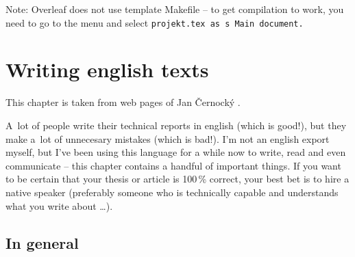 Note: Overleaf does not use template Makefile -- to get compilation to work, you need to go to the menu and select \tt projekt.tex \rm as s~Main document.

\chapter{Writing english texts}
\label{anglicky}
This chapter is taken from web pages of Jan Černocký \cite{CernockyEnglish}.

A~lot of people write their technical reports in english (which is good!), but they make a~lot of unnecesary mistakes (which is bad!). I'm not an english export myself, but I've been using this language for a while now to write, read and even communicate -- this chapter contains a handful of important things. If you want to be certain that your thesis or article is 100\,\% correct, your best bet is to hire a native speaker (preferably someone who is technically capable and understands what you write about \ldots).


\section*{In general}

